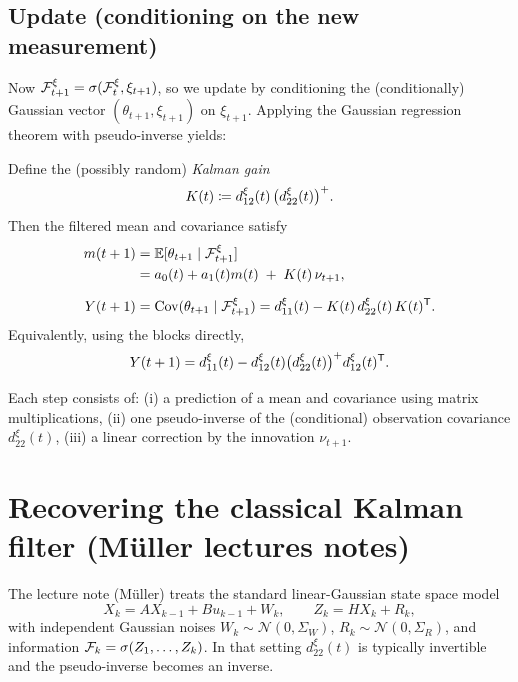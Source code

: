 \subsection{Update (conditioning on the new measurement)}
Now \(\mathcal{F}_{t+1}^\xi = \sigma(\mathcal{F}_t^\xi,\xi_{t+1})\), so we update by conditioning the (conditionally) Gaussian vector
\((\theta_{t+1},\xi_{t+1})\) on \(\xi_{t+1}\).
Applying the Gaussian regression theorem with pseudo-inverse yields:

\begin{proposition}
Define the (possibly random) \emph{Kalman gain}
\[
K(t)\coloneqq d_{12}^\xi(t)\, \bigl(d_{22}^\xi(t)\bigr)^{+}.
\]
Then the filtered mean and covariance satisfy
\begin{align}
m(t+1)
&= \mathbb{E}[\theta_{t+1}\mid \mathcal{F}_{t+1}^\xi] \nonumber\\
&= a_0(t)+a_1(t)m(t)\;+\;K(t)\,\nu_{t+1}, \label{eq:update_m}\\[2mm]
Y(t+1)
&= \mathrm{Cov}(\theta_{t+1}\mid \mathcal{F}_{t+1}^\xi)
= d_{11}^\xi(t) - K(t)\,d_{22}^\xi(t)\,K(t)^{\mathsf{T}}. \label{eq:update_Y}
\end{align}
Equivalently, using the blocks directly,
\[
Y(t+1)= d_{11}^\xi(t)- d_{12}^\xi(t)\bigl(d_{22}^\xi(t)\bigr)^{+} d_{12}^\xi(t)^{\mathsf{T}}.
\]
\end{proposition}

\begin{remark}
Each step consists of:
(i) a prediction of a mean and covariance using matrix multiplications,
(ii) one pseudo-inverse of the (conditional) observation covariance \(d_{22}^\xi(t)\),
(iii) a linear correction by the innovation \(\nu_{t+1}\).
\end{remark}

\section{Recovering the classical Kalman filter (M\"uller lectures notes)}

The lecture note (M\"uller) treats the standard linear-Gaussian state space model
\[
X_k = A X_{k-1} + B u_{k-1} + W_k,\qquad
Z_k = H X_k + R_k,
\]
with independent Gaussian noises \(W_k\sim \mathcal{N}(0,\Sigma_W)\), \(R_k\sim\mathcal{N}(0,\Sigma_R)\),
and information \(\mathcal{F}_k=\sigma(Z_1,\dots,Z_k)\).
In that setting \(d_{22}^\xi(t)\) is typically invertible and the pseudo-inverse becomes an inverse.

